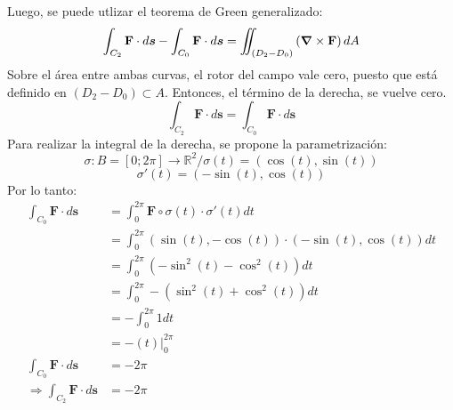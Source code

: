 \begin{solution}
\begin{center}
\begin{tikzpicture}
        \end{tikzpicture}
    \end{center}
    Luego, se puede utlizar el teorema de Green generalizado:
    \begin{equation*}
        \int_{C_2}\mathbf{F}\cdot d\boldsymbol{s} - \int_{C_0}\mathbf{F}\cdot d\boldsymbol{s} = \iint_{\left(D_2-D_0\right)}\left(\grad \times \mathbf{F}\right)dA
    \end{equation*}
    Sobre el área entre ambas curvas, el rotor del campo vale cero, puesto que está definido en $\left(D_2-D_0\right)\subset A$. Entonces, el término de la derecha, se vuelve cero.
    \begin{equation*}
        \int_{C_2}\mathbf{F}\cdot d\boldsymbol{s} = \int_{C_0}\mathbf{F}\cdot d\boldsymbol{s}
    \end{equation*}
    Para realizar la integral de la derecha, se propone la parametrización:
    \begin{equation*}
        \sigma: B=[0;2\pi] \longrightarrow \mathbb{R}^2 / \sigma(t) = (\cos(t),\sin(t))
    \end{equation*}
    \begin{equation*}
        \sigma'(t)=(-\sin(t),\cos(t))
    \end{equation*}
    Por lo tanto:
    \begin{align*}
        \int_{C_0}\mathbf{F}\cdot d\boldsymbol{s}&=\int_{0}^{2\pi}\mathbf{F}\circ\sigma(t) \cdot \sigma'(t) dt\\
        &=\int_{0}^{2\pi} (\sin(t),-\cos(t)) \cdot (-\sin(t),\cos(t)) dt\\
        &=\int_{0}^{2\pi} \left(-\sin^2(t)-\cos^2(t)\right) dt\\
        &=\int_{0}^{2\pi} -\left(\sin^2(t)+\cos^2(t)\right) dt\\
        &=-\int_{0}^{2\pi} 1 dt\\
        &=-\left.\left(t\right)\right|_{0}^{2\pi}\\
        \int_{C_0}\mathbf{F}\cdot d\boldsymbol{s}&=-2\pi\\
        \Rightarrow \int_{C_2}\mathbf{F}\cdot d\boldsymbol{s}&=-2\pi
    \end{align*}
\end{solution}


